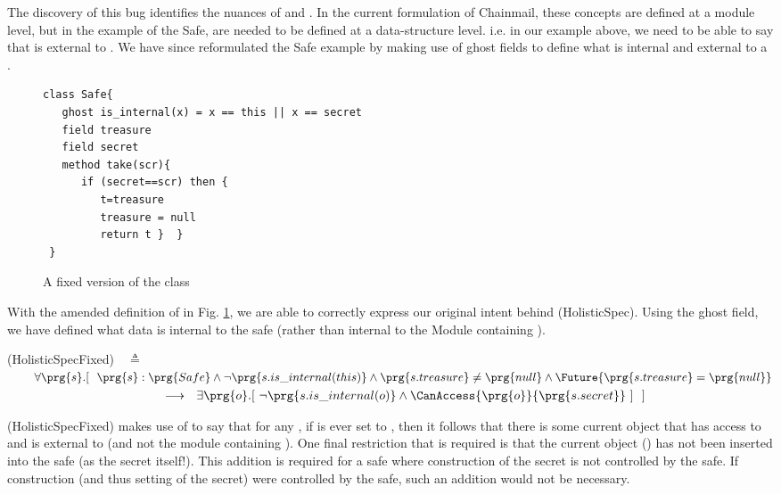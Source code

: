 The discovery of this bug identifies the nuances of  and . In the current formulation of 
Chainmail, these concepts are defined at a module level, but in the example of the Safe, are needed to be defined 
at a data-structure level. i.e. in our example above, we need to be able to say that  is external to .
We have since reformulated the Safe example by making use of ghost fields to define what is internal and external 
to a .

 \begin{figure}[htb]
\begin{lstlisting}
class Safe{
   ghost is_internal(x) = x == this || x == secret
   field treasure 
   field secret 
   method take(scr){
      if (secret==scr) then {
         t=treasure
         treasure = null
         return t }  }
 }
\end{lstlisting}
  \vspace*{-0.95cm}
  \caption{A fixed version of the class }
 \label{fig:ExampleSafeFix}
 \end{figure}
 
 With the amended definition of  in Fig. \ref{fig:ExampleSafeFix}, we are able to correctly express our original intent behind (HolisticSpec).
 Using the  ghost field, we have defined what data is internal to the safe (rather than internal to the Module containing ).
 
\vspace{.1in}
(HolisticSpecFixed)\ \  $\triangleq$\\ 
$\strut \hspace{.3in}   \forall \prg{s}. %
[\ \ \prg{s}:\prg{Safe} \wedge \neg \prg{s.is\_internal(this)} \wedge \prg{s.treasure}\neq\prg{null}   \wedge   \Future{\prg{s.treasure}=\prg{null}} $ \\ 
 $ \strut \hspace{4.3cm}     \longrightarrow \ \  \exists \prg{o}. [\ \neg \prg{s.is\_internal(o)}  \wedge  \CanAccess{\prg{o}}{\prg{s.secret}}\ ]  \  \ ] \hfill $
\vspace{.1in}

 (HolisticSpecFixed) makes use of  to say that for any  , if  is ever set to , then it follows that
 there is some current object  that has access to  and is external to  (and not the module containing ). One final restriction that is required is that 
 the current object () has not been inserted into the safe (as the secret itself!). This addition is required for a safe where construction of the 
 secret is not controlled by the safe. If construction (and thus setting of the secret) were controlled by the safe, such an addition would not be necessary.